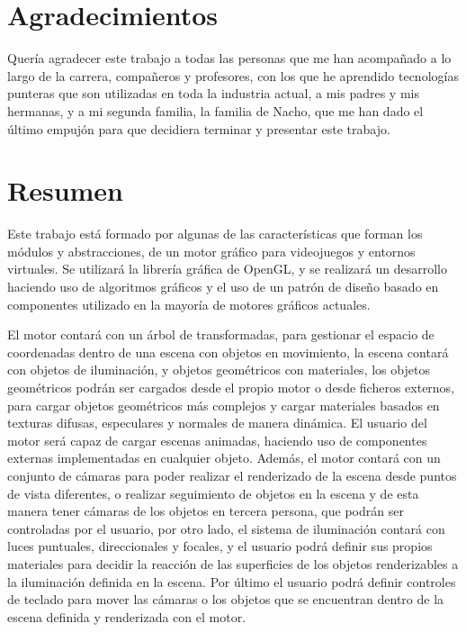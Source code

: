 \documentclass[a4paper]{book}
\begin{document}

\chapter*{Agradecimientos}

Quería agradecer este trabajo a todas las personas que me han acompañado a lo largo de la
carrera, compañeros y profesores, con los que he aprendido tecnologías punteras que son
utilizadas en toda la industria actual, a mis padres y mis hermanas, y a mi segunda familia,
la familia de Nacho, que me han dado el último empujón para que decidiera terminar y
presentar este trabajo.

\chapter*{Resumen}

Este trabajo está formado por algunas de las características que forman los módulos
y abstracciones, de un motor gráfico para videojuegos y entornos virtuales. Se utilizará
la librería gráfica de OpenGL, y se realizará un desarrollo haciendo uso de algoritmos
gráficos y el uso de un patrón de diseño basado en componentes utilizado en la mayoría
de motores gráficos actuales.


El motor contará con un árbol de transformadas, para gestionar el espacio de coordenadas
dentro de una escena con objetos en movimiento, la escena contará con objetos de iluminación,
y objetos geométricos con materiales, los objetos geométricos podrán ser cargados desde el
propio motor o desde ficheros externos, para cargar objetos geométricos más complejos y
cargar materiales basados en texturas difusas, especulares y normales de manera dinámica.
El usuario del motor será capaz de cargar escenas animadas, haciendo uso de componentes
externas implementadas en cualquier objeto. Además, el motor contará con un conjunto de
cámaras para poder realizar el renderizado de la escena desde puntos de vista diferentes,
o realizar seguimiento de objetos en la escena y de esta manera tener cámaras de los
objetos en tercera persona, que podrán ser controladas por el usuario, por otro lado, 
el sistema de iluminación contará con luces puntuales, direccionales y focales, y el usuario podrá
definir sus propios materiales para decidir la reacción de las superficies de los
objetos renderizables a la iluminación definida en la escena. Por último el usuario
podrá definir controles de teclado para mover las cámaras o los objetos que se encuentran
dentro de la escena definida y renderizada con el motor.
\end{document}
